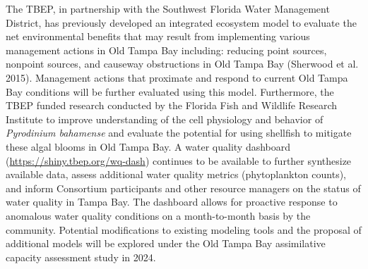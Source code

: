 \documentclass[
  letterpaper,
  DIV=11,
  numbers=noendperiod]{scrreport}
\begin{document}
The TBEP, in partnership with the Southwest Florida Water Management
District, has previously developed an integrated ecosystem model to
evaluate the net environmental benefits that may result from
implementing various management actions in Old Tampa Bay including:
reducing point sources, nonpoint sources, and causeway obstructions in
Old Tampa Bay (Sherwood et al. 2015). Management actions that proximate
and respond to current Old Tampa Bay conditions will be further
evaluated using this model. Furthermore, the TBEP funded research
conducted by the Florida Fish and Wildlife Research Institute to improve
understanding of the cell physiology and behavior of \emph{Pyrodinium
bahamense} and evaluate the potential for using shellfish to mitigate
these algal blooms in Old Tampa Bay. A water quality dashboard
(\url{https://shiny.tbep.org/wq-dash}) continues to be available to
further synthesize available data, assess additional water quality
metrics (phytoplankton counts), and inform Consortium participants and
other resource managers on the status of water quality in Tampa Bay. The
dashboard allows for proactive response to anomalous water quality
conditions on a month-to-month basis by the community. Potential
modifications to existing modeling tools and the proposal of additional
models will be explored under the Old Tampa Bay assimilative capacity
assessment study in 2024.
\end{document}
